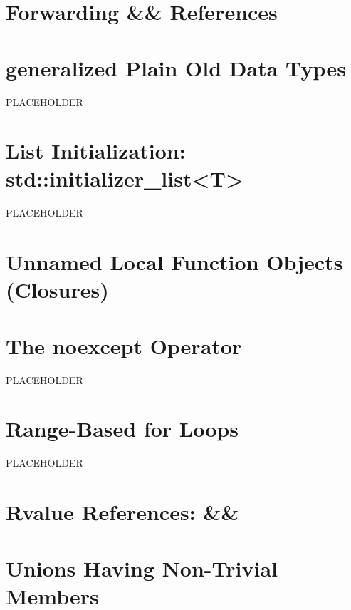 \newpage
\section[Forwarding References]{Forwarding {\SecCode \&\&} References}\label{forwardingref}\label{forwarding-references}


\newpage
\section[Generalized PODs]{generalized Plain Old Data Types}%
% 
PLACEHOLDER

\newpage
\section[{\tt initializer\_list}]{List Initialization: {\SecCode std::initializer\_list<T>}}%
%
PLACEHOLDER

\newpage
\section[Lambdas]{Unnamed Local Function Objects (Closures)}\label{lambda}


\newpage
\section[{\tt noexcept} Operator]{The {\SecCode noexcept} Operator}%
%
PLACEHOLDER

\newpage
\section[Range {\tt for}]{Range-Based {\SecCode for} Loops}%
%
PLACEHOLDER

\newpage
\section[{\itshape rvalue} References]{Rvalue References: {\SecCode \&\&}}\label{Rvalue-References}


\newpage
\section[{\tt union} '11]{Unions Having Non-Trivial Members}\label{unrestricted-unions}


